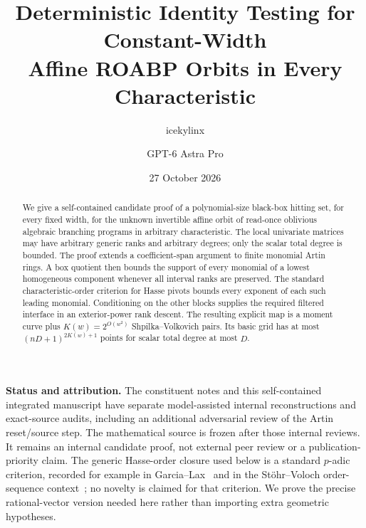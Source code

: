 
\usepackage{mathtools}
\newtheorem{theorem}{Theorem}[section]
\newtheorem{lemma}[theorem]{Lemma}
\newtheorem{corollary}[theorem]{Corollary}
\newtheorem{definition}[theorem]{Definition}
\newcommand{\F}{\mathbb F}
\newcommand{\SV}{\operatorname{SV}}
\newcommand{\wt}{\operatorname{wt}}
\newcommand{\pdeg}{\operatorname{pdeg}}
\newcommand{\Coeff}{\operatorname{Coeff}}
\newcommand{\Span}{\operatorname{span}}
\newcommand{\rank}{\operatorname{rank}}
\newcommand{\Mat}{\operatorname{Mat}}
\newcommand{\GL}{\operatorname{GL}}
\newcommand{\rowspan}{\operatorname{rowspan}}
\title{Deterministic Identity Testing for Constant-Width\\
Affine ROABP Orbits in Every Characteristic}
\author{icekylinx \and GPT-6 Astra Pro}
\date{27 October 2026}
\maketitle

\begin{abstract}
We give a self-contained candidate proof of a polynomial-size black-box
hitting set, for every fixed width, for the unknown invertible affine
orbit of read-once oblivious algebraic branching programs in arbitrary
characteristic. The local univariate matrices may have arbitrary generic
ranks and arbitrary degrees; only the scalar total degree is bounded.
The proof extends a coefficient-span argument to finite monomial Artin
rings. A box quotient then bounds the support of every monomial of a
lowest homogeneous component whenever all interval ranks are preserved.
The standard characteristic-order criterion for Hasse pivots bounds
every exponent of each such leading monomial. Conditioning on the other
blocks supplies the required filtered interface in an exterior-power
rank descent. The resulting explicit map is a moment curve plus
$K(w)=2^{O(w^2)}$ Shpilka--Volkovich pairs. Its basic grid has at most
$(nD+1)^{2K(w)+1}$ points for scalar total degree at most $D$.
\end{abstract}

\noindent\textbf{Status and attribution.}
The constituent notes and this self-contained integrated manuscript have
separate model-assisted internal reconstructions and exact-source audits,
including an additional adversarial review of the Artin reset/source step.
The mathematical source is frozen after those internal reviews. It remains
an internal candidate proof, not external peer review or a
publication-priority claim.
The generic Hasse-order closure used below is a standard $p$-adic
criterion, recorded for example in Garcia--Lax~\cite[Proposition 1.1]{GL92}
and in the St\"ohr--Voloch order-sequence context~\cite{SV86}; no novelty
is claimed for that criterion. We prove the precise rational-vector
version needed here rather than importing extra geometric hypotheses.


